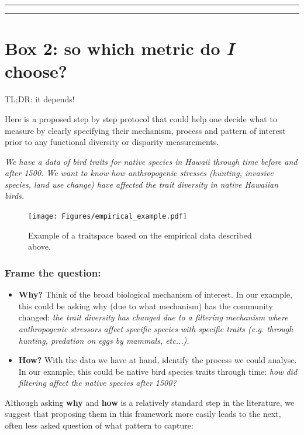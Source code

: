 \documentclass[12pt,letterpaper]{article}
\begin{document}
\bigskip
\bigskip
\hrule
\hrule

\section*{Box 2: so which metric do \textit{I} choose?}

TL;DR: it depends!

Here is a proposed step by step protocol that could help one decide what to measure by clearly specifying their mechanism, process and pattern of interest prior to any functional diversity or disparity measurements.

\textit{We have a data of bird traits for native species in Hawaii through time before and after 1500.
We want to know how anthropogenic stresses (hunting, invasive species, land use change) have affected the trait diversity in native Hawaiian birds.}

\begin{figure}[!htbp]
\centering
   \texttt{[image: Figures/empirical\_example.pdf]}
\caption{Example of a traitspace based on the empirical data described above.}
\label{Fig:trait_space_example}
\end{figure}
\bigskip

\subsubsection{Frame the question:}

\begin{itemize}

    \item \textbf{Why?} Think of the broad biological mechanism of interest. In our example, this could be asking why (due to what mechanism) has the community changed: \textit{the trait diversity has changed due to a filtering mechanism where anthropogenic stressors affect specific species with specific traits (e.g. through hunting, predation on eggs by mammals, etc...).}
    \item \textbf{How?} With the data we have at hand, identify the process we could analyse. In our example, this could be native bird species traits through time: \textit{how did filtering affect the native species after 1500?}

\end{itemize}

Although asking \textbf{why} and \textbf{how} is a relatively standard step in the literature, we suggest that proposing them in this framework more easily leads to the next, often less asked question of what pattern to capture:
\end{document}
